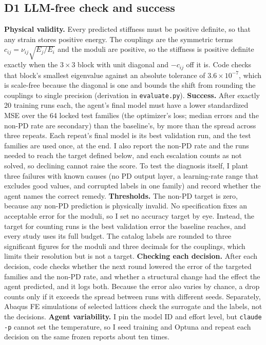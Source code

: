 \documentclass[11pt]{article}
\begin{document}
\subsection*{D1 \quad LLM-free check and success}
\textbf{Physical validity.} Every predicted stiffness must be positive definite, so that any strain
stores positive energy. The couplings are the symmetric terms $c_{ij}=\nu_{ij}\sqrt{E_j/E_i}$ and the
moduli are positive, so the stiffness is positive definite exactly when the $3\times3$ block with
unit diagonal and $-c_{ij}$ off it is. Code checks that block's smallest eigenvalue against an
absolute tolerance of $3.6\times10^{-7}$, which is scale-free because the diagonal is one and bounds
the shift from rounding the couplings to single precision (derivation in \texttt{evaluate.py}).
\textbf{Success.} After exactly 20 training runs each, the agent's final model must have a lower
standardized MSE over the 64 locked test families (the optimizer's loss; median errors and the
non-PD rate are secondary) than the baseline's, by more than the spread across three repeats. Each
repeat's final model is its best validation run, and the test families are used once, at the end. I also report the non-PD rate and the runs
needed to reach the target defined below, and each escalation counts as not solved, so declining
cannot raise the score. To test the diagnosis itself, I plant three failures with known causes
(no PD output layer, a learning-rate range that excludes good values, and corrupted labels in one
family) and record whether the agent names the correct remedy.
\textbf{Thresholds.} The non-PD target is zero, because any non-PD prediction is physically
invalid. No specification fixes an acceptable error for the moduli, so I set no accuracy target by
eye. Instead, the target for counting runs is the best validation error the baseline reaches, and
every study uses its full budget. The catalog labels are rounded to three significant figures for
the moduli and three decimals for the couplings, which limits their resolution but is not a target.
\textbf{Checking each decision.} After each decision, code checks whether the next round lowered
the error of the targeted families and the non-PD rate, and whether a structural change had the
effect the agent predicted, and it logs both. Because the error also varies by chance, a drop
counts only if it exceeds the spread between runs with different seeds. Separately, Abaqus FE
simulations of selected lattices check the surrogate and the labels, not the decisions.
\textbf{Agent variability.} I pin the model ID and effort level, but \texttt{claude -p} cannot
set the temperature, so I seed training and Optuna and repeat each decision on the same frozen
reports about ten times.
\end{document}
